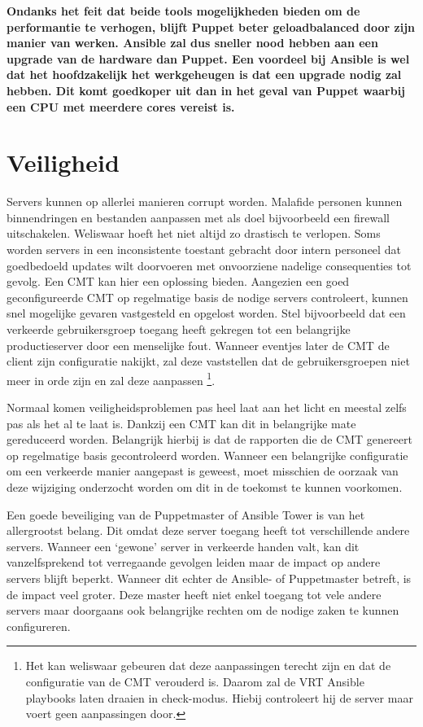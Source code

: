  \textbf{Ondanks het feit dat beide tools mogelijkheden bieden om de performantie te verhogen, blijft Puppet beter geloadbalanced door zijn manier van werken. Ansible zal dus sneller nood hebben aan een upgrade van de hardware dan Puppet. Een voordeel bij Ansible is wel dat het hoofdzakelijk het werkgeheugen is dat een upgrade nodig zal hebben. Dit komt goedkoper uit dan in het geval van Puppet waarbij een CPU met meerdere cores vereist is. }
 

 
 
 \section{Veiligheid}
 \label{sec:veiligheid}
Servers kunnen op allerlei manieren  corrupt worden. Malafide personen kunnen binnendringen en bestanden aanpassen met als doel bijvoorbeeld een firewall uitschakelen. Weliswaar hoeft het niet altijd zo drastisch te verlopen. Soms worden servers in een inconsistente toestant gebracht door intern personeel dat goedbedoeld updates wilt doorvoeren met onvoorziene nadelige consequenties tot gevolg.
Een \gls{CMT} kan hier een oplossing bieden.  Aangezien een goed geconfigureerde \gls{CMT} op regelmatige basis de nodige servers controleert, kunnen snel mogelijke gevaren vastgesteld en opgelost worden. Stel bijvoorbeeld dat een verkeerde gebruikersgroep toegang heeft gekregen tot een belangrijke productieserver door een menselijke fout. Wanneer eventjes later de \gls{CMT} de client zijn configuratie nakijkt, zal deze vaststellen dat de gebruikersgroepen niet meer in orde zijn en zal deze aanpassen \footnote{Het kan weliswaar gebeuren dat deze aanpassingen terecht zijn en dat de configuratie van de \gls{CMT} verouderd is. Daarom zal de \gls{VRT} Ansible playbooks laten draaien in check-modus. Hiebij controleert hij de server maar voert geen aanpassingen door.}. 

Normaal komen veiligheidsproblemen pas heel laat aan het licht en meestal zelfs pas als het al te laat is. Dankzij een \gls{CMT} kan dit in belangrijke mate gereduceerd worden. Belangrijk hierbij is dat de rapporten die de \gls{CMT} genereert op regelmatige basis gecontroleerd worden.  Wanneer een belangrijke configuratie om een verkeerde manier aangepast is geweest, moet misschien de oorzaak van deze wijziging onderzocht worden om dit in de toekomst te kunnen voorkomen.

Een goede beveiliging van de Puppetmaster of Ansible Tower is van het allergrootst belang. Dit omdat deze server toegang heeft tot verschillende andere servers. Wanneer een ‘gewone' server in verkeerde handen valt, kan dit vanzelfsprekend tot verregaande gevolgen leiden maar de impact op andere servers blijft beperkt. Wanneer dit echter de Ansible- of Puppetmaster betreft, is de impact veel groter. Deze master heeft niet enkel toegang tot vele andere servers maar doorgaans ook belangrijke rechten om de nodige zaken te kunnen configureren.

